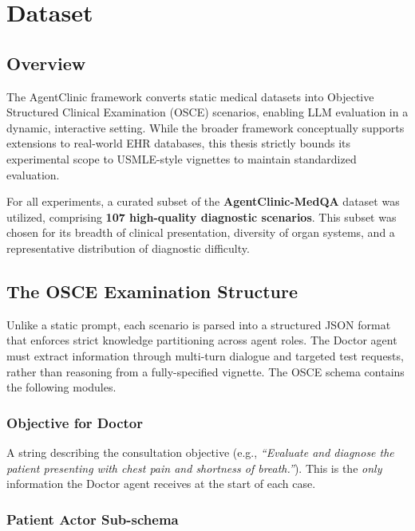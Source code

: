 \chapter{Dataset}
\label{Chapter3}

\section{Overview}

The AgentClinic framework converts static medical datasets into Objective Structured Clinical Examination (OSCE) scenarios, enabling LLM evaluation in a dynamic, interactive setting. While the broader framework conceptually supports extensions to real-world EHR databases, this thesis strictly bounds its experimental scope to USMLE-style vignettes to maintain standardized evaluation.

For all experiments, a curated subset of the \textbf{AgentClinic-MedQA} dataset was utilized, comprising \textbf{107 high-quality diagnostic scenarios}. This subset was chosen for its breadth of clinical presentation, diversity of organ systems, and a representative distribution of diagnostic difficulty.

\section{The OSCE Examination Structure}

Unlike a static prompt, each scenario is parsed into a structured JSON format that enforces strict knowledge partitioning across agent roles. The Doctor agent must extract information through multi-turn dialogue and targeted test requests, rather than reasoning from a fully-specified vignette. The OSCE schema contains the following modules.

\subsection{Objective for Doctor}

A string describing the consultation objective (e.g., \textit{``Evaluate and diagnose the patient presenting with chest pain and shortness of breath.''}). This is the \textit{only} information the Doctor agent receives at the start of each case.

\subsection{Patient Actor Sub-schema}

